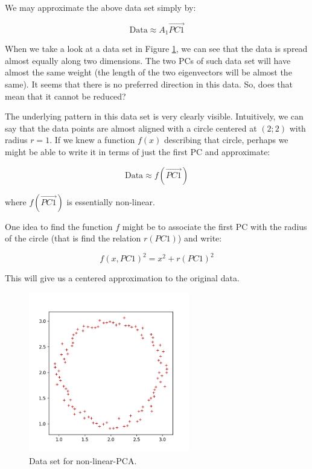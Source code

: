 \documentclass[10pt,twocolumn]{article}
\begin{document}
We may approximate the above data set simply by:

\begin{equation}
\text{Data} \approx A_1 \vec{PC1}
\end{equation}

When we take a look at a data set in Figure \ref{fig:nonlinear_PCA_data}, we can see that the data is spread almost equally along two dimensions. The two PCs of such data set will have almost the same weight (the length of the two eigenvectors will be almost the same). It seems that there is no preferred direction in this data. So, does that mean that it cannot be reduced?

The underlying pattern in this data set is very clearly visible. Intuitively, we can say that the data points are almost aligned with a circle centered at $(2;2)$ with radius $r=1$. If we knew a function $f(x)$ describing that circle, perhaps we might be able to write it in terms of just the first PC and approximate:

\begin{equation}
\text{Data} \approx f(\vec{PC1})
\end{equation}

where $f(\vec{PC1})$ is essentially non-linear.

One idea to find the function $f$ might be to associate the first PC with the radius of the circle (that is find the relation $r(PC1)$) and write:

\begin{equation}
f(x, PC1)^2 = x^2 + r(PC1)^2
\end{equation}

This will give us a centered approximation to the original data. 

\begin{figure}[H]
\centering\includegraphics[width=7cm]{../python-graphs/PCA_nonlinear_scatter_2.png}
\caption{Data set for non-linear-PCA.}			
\label{fig:nonlinear_PCA_data}
\end{figure}
\end{document}
